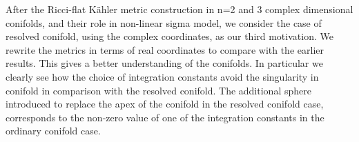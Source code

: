 \documentclass[a4paper,12pt]{article}
\begin{document}
{\vspace{0.5cm}

After the Ricci-flat K\"{a}hler metric construction  
in n=2 and 3 complex dimensional conifolds, and their role in non-linear sigma model, we consider the case of resolved conifold, using the complex coordinates, as 
our third motivation. 
We rewrite the metrics in
terms of real coordinates to compare with the earlier results. This gives a better
understanding of the conifolds. In particular we clearly see how the choice of integration
constants avoid the singularity in conifold in comparison with the resolved conifold. The
additional sphere introduced to replace the apex of the conifold in the resolved conifold
case, corresponds to the non-zero value of one of the integration constants in
the ordinary conifold case.  

\vspace{0.5cm}

{}

\vspace{0.5cm}

}
\end{document}
